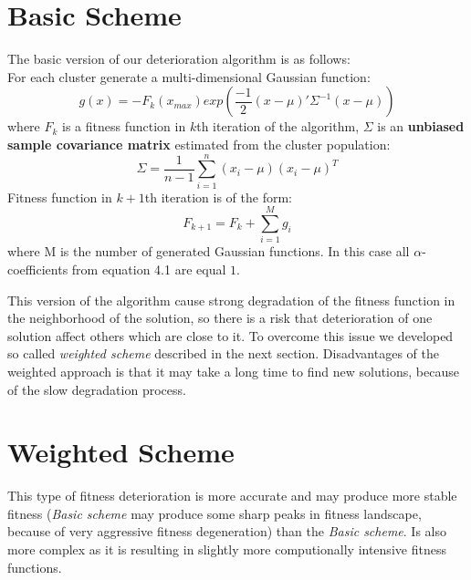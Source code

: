 \section{Basic Scheme}

The basic version of our deterioration algorithm is as follows: \\
For each cluster generate a multi-dimensional Gaussian function:
\begin{equation}
 g(x)= - F_k(x_{max}) exp(\frac{-1}{2}(x-\mu)'\Sigma^{-1}(x - \mu))
\end{equation}
where $F_k$ is a fitness function in $k$th iteration of the algorithm,
$\Sigma$ is an \textbf{unbiased sample covariance matrix} \cite{covariance}
estimated from the cluster population:
\begin{equation}
 \Sigma = \frac{1}{n-1}\sum_{i=1}^n(x_i - \mu)(x_i - \mu)^T
\end{equation}
Fitness function in $k+1$th iteration is of the form:
\begin{equation}
 F_{k+1}=F_k + \sum_{i=1}^M g_i
\end{equation}
where M is the number of generated Gaussian functions. In this case all
$\alpha$-coefficients from equation 4.1 are equal $1$.

This version of the algorithm cause strong degradation of the fitness function
in the neighborhood of the solution, so there is a risk that deterioration of
one solution affect others which are close to it. To overcome this issue we
developed so called \textit{weighted scheme} described in the next section.
Disadvantages of the weighted approach is that it may take a long time
to find new solutions, because of the slow degradation process. 

\section{Weighted Scheme}

This type of fitness deterioration is more accurate and may produce more 
stable fitness (\textit{Basic scheme} may produce some sharp peaks in 
fitness landscape, because of very aggressive fitness degeneration) than the 
\textit{Basic scheme}. Is also more complex as it is resulting in
slightly more computionally intensive fitness functions.

